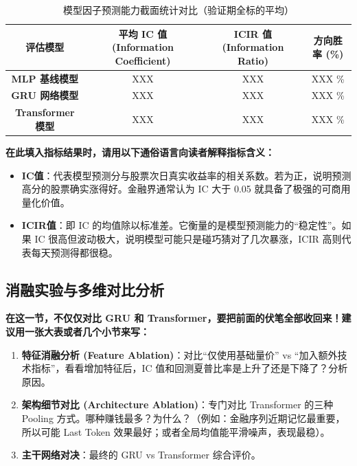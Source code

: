 \documentclass[9pt,a4paper,twoside]{rho-class/rho}
\begin{document}
    \begin{table}[bp]
        \centering
        \begin{tabular}{|c|c|c|c|}
        \hline
        \textbf{评估模型} & \textbf{平均 IC 值 (Information Coefficient)} & \textbf{ICIR 值 (Information Ratio)} & \textbf{方向胜率 (\%)} \\ \hline
        \textbf{MLP 基线模型} & XXX  & XXX & XXX \% \\ \hline
        \textbf{GRU 网络模型} & XXX  & XXX & XXX \% \\ \hline
        \textbf{Transformer 模型} & XXX  & XXX & XXX \% \\ \hline
        \end{tabular}
        \caption{模型因子预测能力截面统计对比（验证期全标的平均）}
        \label{tab:factor-eval}
    \end{table}

    \begin{rhoenv}[frametitle=填写建议：指标金融学含义解读]
    \textbf{在此填入指标结果时，请用以下通俗语言向读者解释指标含义：}
    \begin{itemize}
        \item \textbf{IC值}：代表模型预测分与股票次日真实收益率的相关系数。若为正，说明预测高分的股票确实涨得好。金融界通常认为 IC 大于 0.05 就具备了极强的可商用量化价值。
        \item \textbf{ICIR值}：即 IC 的均值除以标准差。它衡量的是模型预测能力的“稳定性”。如果 IC 很高但波动极大，说明模型可能只是碰巧猜对了几次暴涨，ICIR 高则代表每天预测得都很稳。
    \end{itemize}
    \end{rhoenv}

    \subsection{消融实验与多维对比分析}
    \begin{rhoenv}[frametitle=填写建议：多维度实验结果对比]
    \textbf{在这一节，不仅仅对比 GRU 和 Transformer，要把前面的伏笔全部收回来！建议用一张大表或者几个小节来写：}
    \begin{enumerate}
        \item \textbf{特征消融分析 (Feature Ablation)}：对比“仅使用基础量价” vs “加入额外技术指标”，看看增加特征后，IC 值和回测夏普比率是上升了还是下降了？分析原因。
        \item \textbf{架构细节对比 (Architecture Ablation)}：专门对比 Transformer 的三种 Pooling 方式。哪种赚钱最多？为什么？（例如：金融序列近期记忆最重要，所以可能 Last Token 效果最好；或者全局均值能平滑噪声，表现最稳）。
        \item \textbf{主干网络对决}：最终的 GRU vs Transformer 综合评价。
    \end{enumerate}
    \end{rhoenv}
\end{document}
